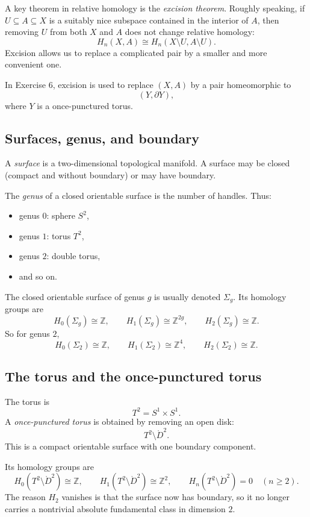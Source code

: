 \documentclass[12pt,a4paper]{article}
\theoremstyle{notespace}
\begin{document}
A key theorem in relative homology is the \emph{excision theorem}. Roughly speaking, if \(U\subseteq A\subseteq X\) is a suitably nice subspace contained in the interior of \(A\), then removing \(U\) from both \(X\) and \(A\) does not change relative homology:
\[
H_n(X,A)\cong H_n(X\setminus U, A\setminus U).
\]
Excision allows us to replace a complicated pair by a smaller and more convenient one.

In Exercise 6, excision is used to replace \((X,A)\) by a pair homeomorphic to
\[
(Y,\partial Y),
\]
where \(Y\) is a once-punctured torus.

\subsection{Surfaces, genus, and boundary}

A \emph{surface} is a two-dimensional topological manifold. A surface may be closed (compact and without boundary) or may have boundary.

The \emph{genus} of a closed orientable surface is the number of handles. Thus:

\begin{itemize}
	\item genus \(0\): sphere \(S^2\),
	\item genus \(1\): torus \(T^2\),
	\item genus \(2\): double torus,
	\item and so on.
\end{itemize}

The closed orientable surface of genus \(g\) is usually denoted \(\Sigma_g\). Its homology groups are
\[
H_0(\Sigma_g)\cong \mathbb Z,\qquad
H_1(\Sigma_g)\cong \mathbb Z^{2g},\qquad
H_2(\Sigma_g)\cong \mathbb Z.
\]
So for genus \(2\),
\[
H_0(\Sigma_2)\cong \mathbb Z,\qquad
H_1(\Sigma_2)\cong \mathbb Z^4,\qquad
H_2(\Sigma_2)\cong \mathbb Z.
\]

\subsection{The torus and the once-punctured torus}

The torus is
\[
T^2=S^1\times S^1.
\]
A \emph{once-punctured torus} is obtained by removing an open disk:
\[
T^2\setminus \mathring{D}^2.
\]
This is a compact orientable surface with one boundary component.

Its homology groups are
\[
H_0(T^2\setminus \mathring{D}^2)\cong \mathbb Z,\qquad
H_1(T^2\setminus \mathring{D}^2)\cong \mathbb Z^2,\qquad
H_n(T^2\setminus \mathring{D}^2)=0\quad(n\ge 2).
\]
The reason \(H_2\) vanishes is that the surface now has boundary, so it no longer carries a nontrivial absolute fundamental class in dimension \(2\).
\end{document}
